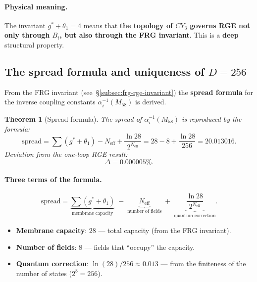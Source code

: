 \documentclass[11pt,a4paper]{article}
\newcommand{\CY}{CY_3}
\newtheorem{theorem}{Theorem}[section]
\theoremstyle{definition}
\begin{document}
\paragraph{Physical meaning.}
The invariant $g^* + \theta_1 = 4$ means that \textbf{the topology 
of $\CY$ governs RGE not only through $B_i$, but also through 
the FRG invariant}. This is a \textbf{deep} structural property.

\subsection{The spread formula and uniqueness of \texorpdfstring{$D = 256$}{D = 256}}
\label{subsec:spread-formula-review}

From the FRG invariant (see~\S\ref{subsec:frg-rge-invariant}) 
the \textbf{spread formula} for the inverse coupling constants 
$\alpha_i^{-1}(M_{58})$ is derived.

\begin{theorem}[Spread formula]
\label{thm:spread-review}
The spread of $\alpha_i^{-1}(M_{58})$ is reproduced by the formula:
\begin{equation}
    \boxed{
    \text{spread} = \sum(g^* + \theta_1) - N_{\text{eff}}
    + \frac{\ln 28}{2^{N_{\text{eff}}}}
    = 28 - 8 + \frac{\ln 28}{256}
    = 20.013016.
    }
    \label{eq:spread-review}
\end{equation}
Deviation from the one-loop RGE result:
\begin{equation}
    \boxed{
    \Delta = 0.000005\%.
    }
    \label{eq:spread-deviation-review}
\end{equation}
\end{theorem}

\paragraph{Three terms of the formula.}
\begin{equation}
    \text{spread} =
    \underbrace{\sum (g^* + \theta_1)}_{\text{membrane capacity}}
    \;-\; \underbrace{N_{\text{eff}}}_{\text{number of fields}}
    \;+\; \underbrace{\frac{\ln 28}{2^{N_{\text{eff}}}}}_{\text{quantum correction}}.
\end{equation}

\begin{itemize}
    \item \textbf{Membrane capacity}: $28$ — total capacity 
          (from the FRG invariant).
    \item \textbf{Number of fields}: $8$ — fields that ``occupy'' the capacity.
    \item \textbf{Quantum correction}: $\ln(28)/256 \approx 0.013$ — 
          from the finiteness of the number of states ($2^8 = 256$).
\end{itemize}
\end{document}
